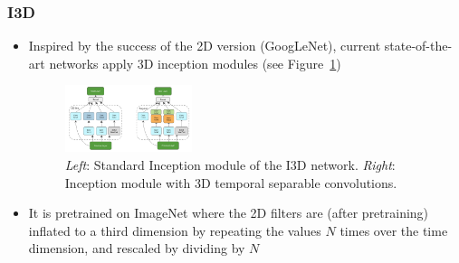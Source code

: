 \subsubsection{I3D}
\begin{itemize}
	\item Inspired by the success of the 2D version (GoogLeNet), current state-of-the-art networks apply 3D inception modules (see Figure~\ref{fig:deep_video_I3D_module})
	\begin{figure}[ht!]
		\centering
		\includegraphics[width=0.35\textwidth]{figures/cv_deep_video_I3D.png}
		\caption{\textit{Left}: Standard Inception module of the I3D network. \textit{Right}: Inception module with 3D temporal separable convolutions.}
		\label{fig:deep_video_I3D_module}
	\end{figure}
	\item It is pretrained on ImageNet where the 2D filters are (after pretraining) inflated to a third dimension by repeating the values $N$ times over the time dimension, and rescaled by dividing by $N$
\end{itemize}
